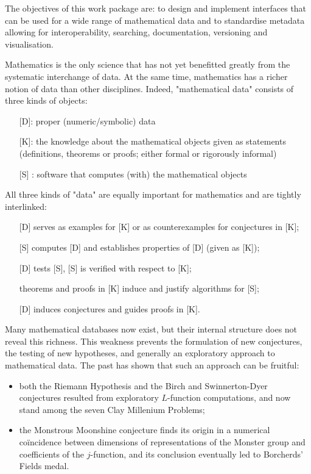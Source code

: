 \begin{workpackage}[id=dksbases,wphases=1-48!.5,
  title=Data/Knowledge/Software-Bases,lead=JU,
  ZHRM=1,JURM=36,USHRM=12,UWRM=3]

\begin{wpobjectives}
The objectives of this work package are: to design and implement interfaces that can be used for a wide range of mathematical data and to standardise metadata allowing for interoperability, searching, documentation, versioning and visualisation.
\end{wpobjectives}


\begin{wpdescription}
Mathematics is the only science that has not yet benefitted greatly from the systematic interchange of data. At the same time, mathematics has a richer notion of data than other disciplines.
Indeed, "mathematical data" consists of three kinds of objects:
\begin{itemize}
\item[] [D]: proper (numeric/symbolic) data
\item[] [K]:  the knowledge about the mathematical objects given as statements (definitions, theorems or proofs; either formal or rigorously informal)
\item[] [S] : software that computes (with) the mathematical objects
\end{itemize}

All three kinds of "data" are equally important for mathematics and are tightly interlinked:
\begin{itemize}
\item[] [D] serves as examples for [K] or as counterexamples for conjectures in [K];
\item[] [S] computes [D] and establishes properties of [D] (given as [K]);
\item[] [D] tests [S], [S] is verified with respect to [K];
\item[] theorems and proofs in [K] induce and justify algorithms for [S];
\item[] [D] induces conjectures and guides proofs in [K].
\end{itemize}

Many mathematical databases now exist, but their internal structure does not reveal this richness. This weakness prevents the formulation of new conjectures, the testing of new hypotheses, and generally an exploratory approach to mathematical data. The past has shown that such an approach can be fruitful: 
\begin{itemize}
\item both the Riemann Hypothesis and the Birch and Swinnerton-Dyer conjectures resulted from exploratory $L$-function computations, and now stand among the seven Clay Millenium Problems;
\item the Monstrous Moonshine conjecture finds its origin in a numerical co\"incidence between dimensions of representations of the Monster group and coefficients of the $j$-function, and its conclusion eventually led to Borcherds' Fields medal.
\end{itemize}


\end{wpdescription}
\end{workpackage}
